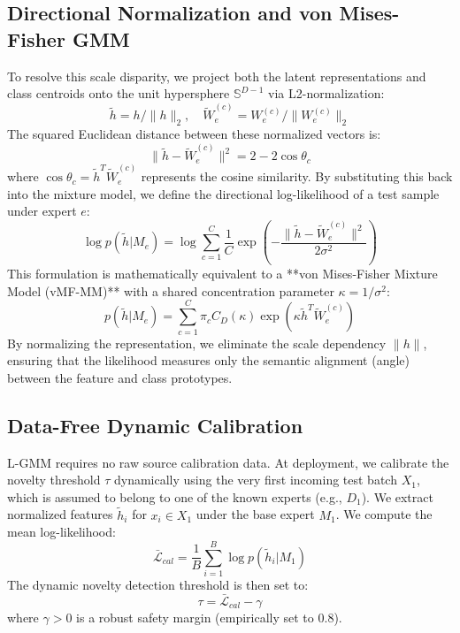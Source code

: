 \documentclass{article}
\theoremstyle{plain}
\theoremstyle{definition}
\theoremstyle{remark}
\begin{document}
\subsection{Directional Normalization and von Mises-Fisher GMM}
\label{sec:vmf}

To resolve this scale disparity, we project both the latent representations and class centroids onto the unit hypersphere $\mathbb{S}^{D-1}$ via L2-normalization:
\begin{equation}
\tilde{h} = h / \|h\|_2, \quad \tilde{W}_e^{(c)} = W_e^{(c)} / \|W_e^{(c)}\|_2
\end{equation}
The squared Euclidean distance between these normalized vectors is:
\begin{equation}
\|\tilde{h} - \tilde{W}_e^{(c)}\|^2 = 2 - 2 \cos \theta_c
\end{equation}
where $\cos \theta_c = \tilde{h}^T \tilde{W}_e^{(c)}$ represents the cosine similarity. By substituting this back into the mixture model, we define the directional log-likelihood of a test sample under expert $e$:
\begin{equation}
\log p(\tilde{h} | M_e) = \log \sum_{c=1}^C \frac{1}{C} \exp \left( -\frac{\|\tilde{h} - \tilde{W}_e^{(c)}\|^2}{2\sigma^2} \right)
\end{equation}
This formulation is mathematically equivalent to a **von Mises-Fisher Mixture Model (vMF-MM)** with a shared concentration parameter $\kappa = 1/\sigma^2$:
\begin{equation}
p(\tilde{h} | M_e) = \sum_{c=1}^C \pi_c C_D(\kappa) \exp\left( \kappa \tilde{h}^T \tilde{W}_e^{(c)} \right)
\end{equation}
By normalizing the representation, we eliminate the scale dependency $\|h\|$, ensuring that the likelihood measures only the semantic alignment (angle) between the feature and class prototypes.

\subsection{Data-Free Dynamic Calibration}
\label{sec:cal}

L-GMM requires no raw source calibration data. At deployment, we calibrate the novelty threshold $\tau$ dynamically using the very first incoming test batch $X_1$, which is assumed to belong to one of the known experts (e.g., $D_1$). 
We extract normalized features $\tilde{h}_i$ for $x_i \in X_1$ under the base expert $M_1$. We compute the mean log-likelihood:
\begin{equation}
\bar{\mathcal{L}}_{cal} = \frac{1}{B} \sum_{i=1}^B \log p(\tilde{h}_i | M_1)
\end{equation}
The dynamic novelty detection threshold is then set to:
\begin{equation}
\tau = \bar{\mathcal{L}}_{cal} - \gamma
\end{equation}
where $\gamma > 0$ is a robust safety margin (empirically set to $0.8$). 
\end{document}
